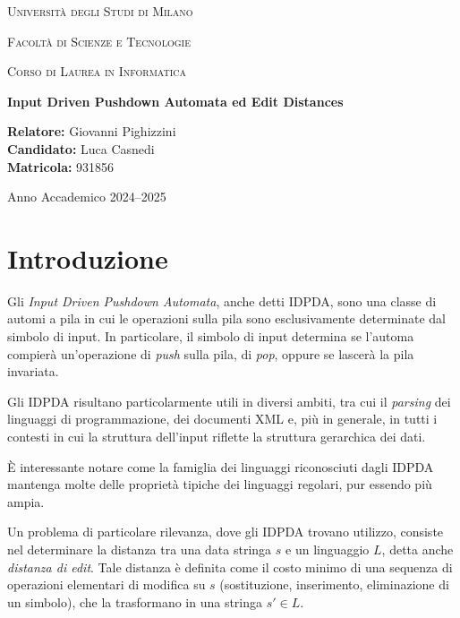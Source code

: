 \documentclass[a4paper,12pt]{report}
\begin{document}
    \begin{titlepage}
        \centering
        {\scshape\LARGE Università degli Studi di Milano \par}
        \vspace{1cm}
        {\scshape\Large Facoltà di Scienze e Tecnologie \par}
        \vspace{0.5cm}
        {\scshape\large Corso di Laurea in Informatica\par}
        \vspace{2cm}
        {\huge\bfseries Input Driven Pushdown Automata ed Edit Distances\par}
        \vspace{2cm}
        \begin{flushleft}
            \textbf{Relatore:} Giovanni Pighizzini\\
            \textbf{Candidato:} Luca Casnedi\\
            \textbf{Matricola:} 931856
        \end{flushleft}
        \vfill
        {\large Anno Accademico 2024--2025\par}
    \end{titlepage}

    \tableofcontents
    \clearpage


    \chapter{Introduzione}

    Gli \emph{Input Driven Pushdown Automata}, anche detti IDPDA, sono una classe di automi a pila in cui le operazioni sulla pila sono esclusivamente determinate dal simbolo di input. In particolare, il simbolo di input determina se l'automa compierà un'operazione di \emph{push} sulla pila, di \emph{pop}, oppure se lascerà la pila invariata.

    Gli IDPDA risultano particolarmente utili in diversi ambiti, tra cui il \emph{parsing} dei linguaggi di programmazione, dei documenti XML e, più in generale, in tutti i contesti in cui la struttura dell'input riflette la struttura gerarchica dei dati.

    È interessante notare come la famiglia dei linguaggi riconosciuti dagli IDPDA mantenga molte delle proprietà tipiche dei linguaggi regolari, pur essendo più ampia.

    Un problema di particolare rilevanza, dove gli IDPDA trovano utilizzo, consiste nel determinare la distanza tra una data stringa $s$ e un linguaggio $L$, detta anche \textit{distanza di edit}. Tale distanza è definita come il costo minimo di una sequenza di operazioni elementari di modifica su $s$ (sostituzione, inserimento, eliminazione di un simbolo), che la trasformano in una stringa $s' \in L$.
\end{document}
